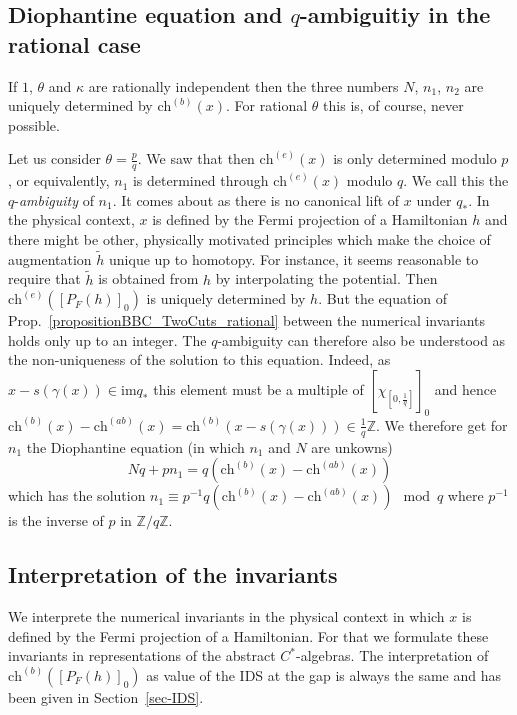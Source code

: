 \documentclass[11pt]{amsart}
\newcommand{\Z}{\mathbb{Z}}
\newcommand{\cut}{\kappa}
\newcommand{\chb}{\text{ch}^{(b)}}
\newcommand{\che}{\text{ch}^{(e)}}
\newcommand{\chab}{\text{ch}^{(ab)}}
\newcommand{\p}{p}
\newcommand{\q}{q}
\begin{document}
\subsection{Diophantine equation and $q$-ambiguitiy in the rational case}
If  $1$, $\theta$ and $\cut$ are rationally independent then the three numbers $N$, $n_1$, $n_2$ are uniquely determined by $\chb(x)$. 
For rational $\theta$ this is, of course, never possible. 

Let us consider $\theta=\frac{\p}{\q}$. 
We saw that then $\che(x)$ is only determined modulo $\p$, or equivalently, $n_1$ is determined through $\che(x)$ modulo $\q$.
We call this the $q$-\emph{ambiguity} of $n_1$. It comes about as there is no canonical lift of $x$ under $q_*$. In the physical context, $x$ is defined by the Fermi projection of a Hamiltonian $h$ and there might be other, physically motivated principles which make the choice of augmentation $\tilde h$ unique up to homotopy. For instance, it seems reasonable to require that $\tilde h$ is obtained from $h$ by interpolating the potential. Then $\che([P_F(h)]_0)$ is uniquely determined by $h$. 
But the equation of Prop.~\ref{propositionBBC_TwoCuts_rational} between the numerical invariants holds only up to an integer. The $q$-ambiguity can therefore also be understood as the non-uniqueness of the solution to this equation. Indeed, as $x-s(\gamma(x))\in \mathrm{im} q_*$ this element must be a multiple of $[\chi_{[0,\frac1{\q}]}]_0$ and hence 
$\chb(x) - \chab(x) = \chb(x-s(\gamma(x))) \in \frac{1}{\q}\Z$. We therefore get for $n_1$ the Diophantine equation (in which $n_1$ and $N$ are unkowns) 
\begin{equation}\label{eq-dioph}
N \q + \p n_1 = \q(\chb(x) - \chab(x))
\end{equation}
which has the solution $n_1 \equiv \p^{-1}\q(\chb(x) - \chab(x))\mod{\q}$ where $\p^{-1}$ is the inverse of $\p$ in $\Z/\q\Z$.
 
 \subsection{\texorpdfstring{Interpretation of the invariants}{}}
We interprete the numerical invariants in the physical context in which $x$ is defined by the Fermi projection of a Hamiltonian. For that we formulate these invariants in representations of the abstract $C^*$-algebras. 
The interpretation of  $\chb([P_F(h)]_0)$ as value of the IDS at the gap is always the same and has been given in Section~\ref{sec-IDS}.
\end{document}
